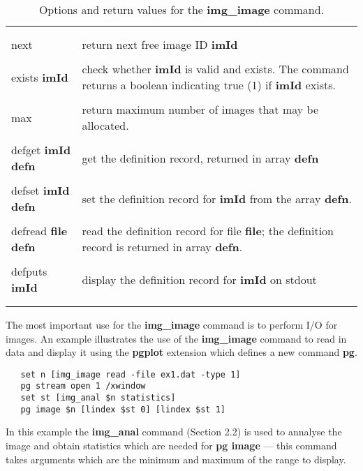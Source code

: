 \begin{table}
\begin{tabular}{|l||l|}
\begin{minipage}[t]{11.0cm}
\end{minipage} \\ 
& \\ 
next & return next free image ID {\bf imId}\\ 
& \\ 
exists {\bf imId} &
\begin{minipage}[t]{11.0cm}
check whether {\bf imId} is valid and exists.  The command returns a
boolean indicating true (1) if {\bf imId} exists.
\end{minipage} \\
& \\ 
max & return maximum number of images that may be allocated.\\ 
& \\ 
defget {\bf imId} {\bf defn} &
\begin{minipage}[t]{11.0cm}
get the definition record, returned in array {\bf defn}
\end{minipage} \\ 
& \\ 
defset {\bf imId} {\bf defn} &
\begin{minipage}[t]{11.0cm}
set the definition record for {\bf imId} from the array {\bf defn}.
\end{minipage} \\ 
& \\ 
defread {\bf file} {\bf defn} & 
\begin{minipage}[t]{11.0cm}
read the definition record for file {\bf file};
the definition record is returned in array {\bf defn}.
\end{minipage} \\ 
& \\ 
defputs {\bf imId} & display the definition record for {\bf imId} on stdout\\ 
& \\ 
& \\ \hline
\end{tabular}
\caption{Options and return values for the {\bf img\_image} command.}
\end{table}
The most important use for the {\bf img\_image} command is to perform
I/O for images. 
An example illustrates the use of the {\bf img\_image} command to
read in data and display it using the {\bf pgplot} extension which
defines a new command {\bf pg}.
\begin{verbatim}
   set n [img_image read -file ex1.dat -type 1]
   pg stream open 1 /xwindow
   set st [img_anal $n statistics]
   pg image $n [lindex $st 0] [lindex $st 1]
\end{verbatim}
In this example the {\bf img\_anal} command (Section 2.2) is used to annalyse 
the image and obtain statistics which are needed for {\bf pg image} --- 
this command takes arguments which are the 
minimum and maximum of the range to display.

